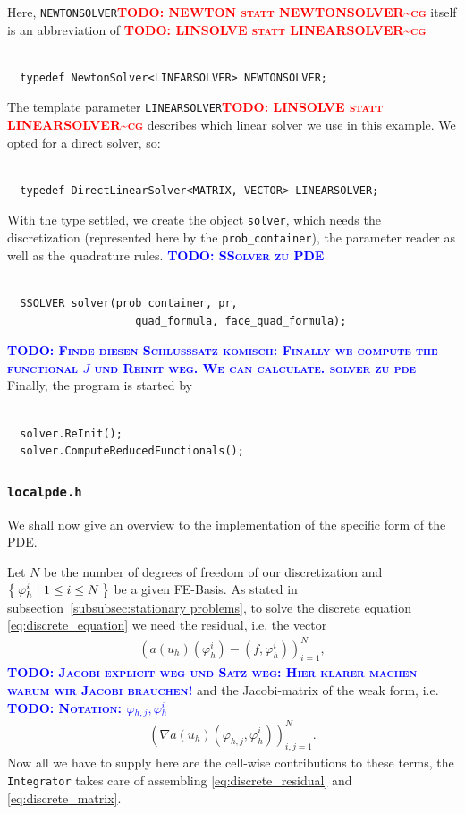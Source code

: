 \documentclass[prodmode,acmtoms]{acmsmall}
\numberwithin{equation}{section}
\renewcommand{\phi}{\varphi}
\newcommand{\todo}[1]{\textbf{\textsc{\textcolor{blue}{TODO: #1}}}}
\newcommand{\todocg}[1]{\textbf{\textsc{\textcolor{red}{TODO: #1\textasciitilde cg}}}}
\begin{document}
Here, \texttt{NEWTONSOLVER}\todocg{NEWTON statt NEWTONSOLVER} itself is an abbreviation of
\todocg{LINSOLVE statt LINEARSOLVER}
\begin{lstlisting}
  
  typedef NewtonSolver<LINEARSOLVER> NEWTONSOLVER;

\end{lstlisting}
The  template parameter \texttt{LINEARSOLVER}\todocg{LINSOLVE statt LINEARSOLVER} describes which linear solver we use in this example. We opted for a direct solver, so: 
\begin{lstlisting}
  
  typedef DirectLinearSolver<MATRIX, VECTOR> LINEARSOLVER;

\end{lstlisting}
With the type settled, we create the object \texttt{solver}, which needs the
discretization (represented here by the \texttt{prob\_container}), the
parameter reader as well as the quadrature rules.
\todo{SSolver zu PDE}
\begin{lstlisting}

  SSOLVER solver(prob_container, pr,
                    quad_formula, face_quad_formula);

\end{lstlisting}
\todo{Finde diesen Schlusssatz komisch: Finally we compute 
the functional $J$ und Reinit weg. We can calculate. solver zu pde}
Finally, the program is started by
\begin{lstlisting}

  solver.ReInit();
  solver.ComputeReducedFunctionals();

\end{lstlisting}

\subsubsection{\texttt{localpde.h}}
We shall now give an overview to the implementation of the specific form of the PDE. 

Let $N$ be the number of degrees of freedom of our discretization and $\Set{\phi_{h}^{i}|1\leq i \leq N}$ be a given FE-Basis. As stated in subsection~\ref{subsubsec:stationary problems}, to solve the discrete equation \eqref{eq:discrete_equation} we need the residual, i.e. the vector
\begin{align}\label{eq:discrete_residual}
\left(a(u_h)(\phi_{h}^{i})-(f,\phi_{h}^{i})\right)_{i=1}^N,
\end{align}
\todo{Jacobi explicit weg und Satz weg: Hier klarer machen warum wir Jacobi brauchen!}
and the Jacobi-matrix of the weak form, i.e.
\todo{Notation: $\phi_{h,j},\phi_{h}^{i}$}
\begin{align}\label{eq:discrete_matrix}
\left(\nabla a(u_h)(\phi_{h,j},\phi_{h}^{i})\right)_{i,j=1}^N.
\end{align}
Now all we have to supply here are the cell-wise contributions to these terms, the \texttt{Integrator} takes care of assembling \eqref{eq:discrete_residual} and \eqref{eq:discrete_matrix}.
\end{document}
